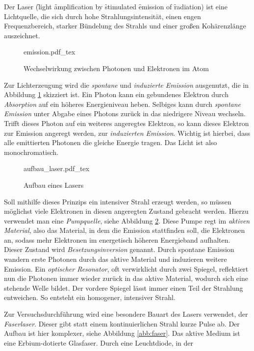 Der Laser (\f light \f amplification by \f stimulated \f emission of \f radiation)
ist eine Lichtquelle, die sich durch hohe Strahlungsintensität, einen engen 
Frequenzbereich, starker Bündelung des Strahls und einer großen Kohärenzlänge 
auszeichnet. \par
\begin{figure}[h]
  \centering
  {emission.pdf_tex}
  \caption{Wechselwirkung zwischen Photonen und Elektronen im Atom}
  \label{abb:emission}
\end{figure}
Zur Lichterzeugung wird die \emph{spontane} und \emph{induzierte Emission} 
ausgenutzt, die in Abbildung \ref{abb:emission} skizziert ist. Ein Photon kann
ein gebundenes Elektron durch \emph{Absorption} auf ein höheres Energieniveau 
heben. Selbiges kann durch \emph{spontane Emission} unter Abgabe eines Photons
zurück in das niedrigere Niveau wechseln. Trifft dieses Photon auf ein weiteres
angeregtes Elektron, so kann dieses Elektron zur Emission angeregt werden, zur
\emph{induzierten Emission}. Wichtig ist hierbei, dass alle emittierten Photonen
die gleiche Energie tragen. Das Licht ist also monochromatisch. \par
\begin{figure}
  \centering
  {aufbau_laser.pdf_tex}
  \caption{Aufbau eines Lasers}
  \label{abb:aufbau_laser}
\end{figure}
Soll mithilfe dieses Prinzips ein intensiver Strahl erzeugt werden, so müssen 
möglichst viele Elektronen in diesen angeregten Zustand gebracht werden. Hierzu
verwendet man eine \emph{Pumpquelle}, siehe Abbildung \ref{abb:aufbau_laser}.
Diese Pumpe regt im \emph{aktiven Material},
also das Material, in dem die Emission stattfinden soll, die Elektronen an, sodass
mehr Elektronen im energetisch höheren Energieband aufhalten. Dieser Zustand wird
\emph{Besetzungsinversion} genannt. Durch spontane Emission wandern erste Photonen
durch das aktive Material und induzieren weitere Emission. 
Ein \emph{optischer Resonator}, oft verwirklicht durch zwei Spiegel, reflektiert nun
die Photonen immer wieder zurück in das aktive Material, wodurch sich eine stehende
Welle bildet. Der vordere Spiegel lässt immer einen Teil der Strahlung entweichen.
So entsteht ein homogener, intensiver Strahl. \par
Zur Versuchsdurchführung wird eine besondere Bauart des Lasers verwendet, der 
\emph{Faserlaser}. Dieser gibt statt einem kontinuierlichen Strahl kurze Pulse ab.
Der Aufbau ist hier komplexer, siehe Abbildung \ref{abb:faser}.
Das aktive Medium ist eine Erbium-dotierte Glasfaser. Durch eine Leuchtdiode, in der
